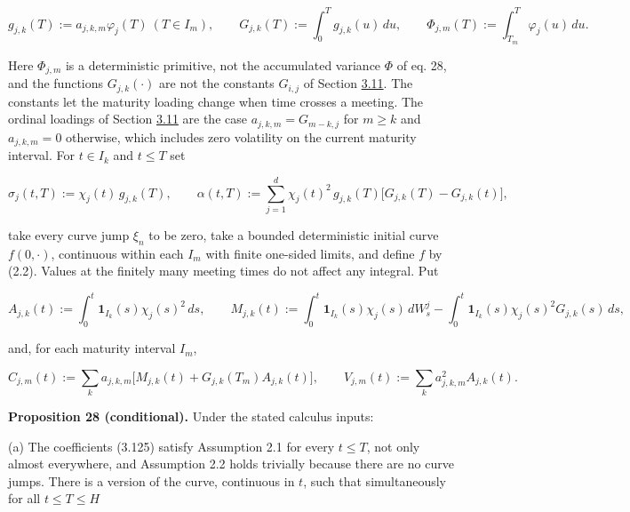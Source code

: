 \documentclass[11pt]{article}
\begin{document}
\begin{equation*}
g_{j,k}(T):=a_{j,k,m}\varphi_j(T)\ (T\in I_m),\qquad G_{j,k}(T):=\int_0^T g_{j,k}(u)\,du,\qquad \Phi_{j,m}(T):=\int_{T_m}^T\varphi_j(u)\,du. \tag{3.124}\label{eq:3.124}
\end{equation*}

Here \(\Phi_{j,m}\) is a deterministic primitive, not the accumulated variance \(\Phi\) of \cite{brace2024sofr} eq. 28, and the functions \(G_{j,k}(\cdot)\) are not the constants \(G_{i,j}\) of Section \hyperref[sec:3.11]{3.11}. The constants let the maturity loading change when time crosses a meeting. The ordinal loadings of Section \hyperref[sec:3.11]{3.11} are the case \(a_{j,k,m}=G_{m-k,j}\) for \(m\ge k\) and \(a_{j,k,m}=0\) otherwise, which includes zero volatility on the current maturity interval. For \(t\in I_k\) and \(t\le T\) set

\begin{equation*}
\sigma_j(t,T):=\chi_j(t)\,g_{j,k}(T),\qquad \alpha(t,T):=\sum_{j=1}^d\chi_j(t)^2\,g_{j,k}(T)\bigl[G_{j,k}(T)-G_{j,k}(t)\bigr], \tag{3.125}\label{eq:3.125}
\end{equation*}

take every curve jump \(\xi_n\) to be zero, take a bounded deterministic initial curve \(f(0,\cdot)\), continuous within each \(I_m\) with finite one-sided limits, and define \(f\) by (2.2). Values at the finitely many meeting times do not affect any integral. Put

\begin{equation*}
A_{j,k}(t):=\int_0^t\mathbf 1_{I_k}(s)\chi_j(s)^2\,ds,\qquad M_{j,k}(t):=\int_0^t\mathbf 1_{I_k}(s)\chi_j(s)\,dW^j_s-\int_0^t\mathbf 1_{I_k}(s)\chi_j(s)^2G_{j,k}(s)\,ds, \tag{3.126}\label{eq:3.126}
\end{equation*}

and, for each maturity interval \(I_m\),

\begin{equation*}
C_{j,m}(t):=\sum_{k}a_{j,k,m}\bigl[M_{j,k}(t)+G_{j,k}(T_m)A_{j,k}(t)\bigr],\qquad V_{j,m}(t):=\sum_k a_{j,k,m}^2A_{j,k}(t). \tag{3.127}\label{eq:3.127}
\end{equation*}

\label{res:Proposition-28}
\textbf{Proposition 28 (conditional).} Under the stated calculus inputs:

(a) The coefficients (3.125) satisfy Assumption 2.1 for every \(t\le T\), not only almost everywhere, and Assumption 2.2 holds trivially because there are no curve jumps. There is a version of the curve, continuous in \(t\), such that simultaneously for all \(t\le T\le H\)
\end{document}
